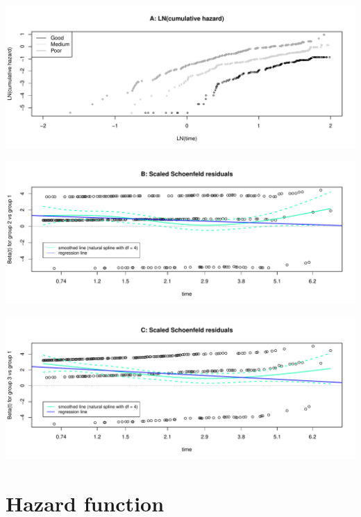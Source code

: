 \documentclass[]{article}
\begin{document}
\newpage

\begin{flushleft}\includegraphics[height=0.29\textheight]{Images/PH_assumption-1} \end{flushleft}

\begin{flushleft}\includegraphics[height=0.29\textheight]{Images/PH_assumption-2} \end{flushleft}

\begin{flushleft}\includegraphics[height=0.29\textheight]{Images/PH_assumption-3} \end{flushleft}

\newpage

\section{Hazard function}\label{hazard-function}
\end{document}
